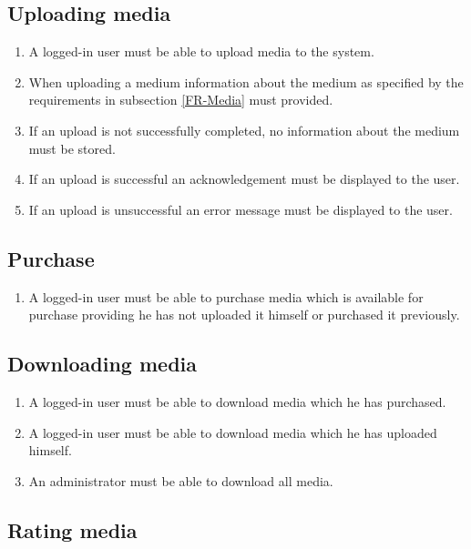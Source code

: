 \documentclass[../report.tex]{subfiles}
\begin{document}
\subsection {Uploading media}

\begin{enumerate}[label=FR-\twodigits*, resume]
	\item A logged-in user must be able to upload media to the system.
	\item When uploading a medium information about the medium as specified by the requirements in subsection \ref{FR-Media} must provided.
	\item If an upload is not successfully completed, no information about the medium must be stored.
	\item If an upload is successful an acknowledgement must be displayed to the user.
	\item If an upload is unsuccessful an error message must be displayed to the user. 
\end{enumerate}

\subsection {Purchase}

\begin{enumerate}[label=FR-\twodigits*, resume]
	\item A logged-in user must be able to purchase media which is available for purchase providing he has not uploaded it himself or  purchased it previously.
\end{enumerate}

\subsection {Downloading media}

\begin{enumerate}[label=FR-\twodigits*, resume]
	\item A logged-in user must be able to download media which he has purchased.
	\item A logged-in user must be able to download media which he has uploaded himself.
	\item An administrator must be able to download all media.
\end{enumerate}
		
\subsection {Rating media} \label{FR-RatingMedia}
\end{document}
